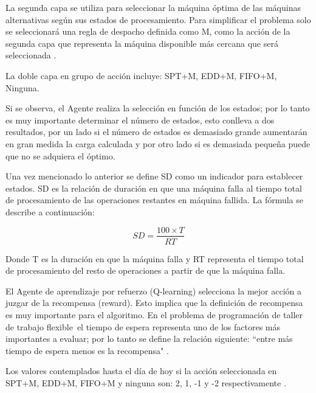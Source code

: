 \documentclass[letterpaper, 10 pt]{article}
\newcommand{\fjsp}{problema de programación de taller de trabajo flexible}
\begin{document}
La segunda capa se utiliza para seleccionar la máquina óptima de las máquinas alternativas según sus estados de procesamiento. Para simplificar el problema solo se seleccionará una regla de despacho definida como M, como la acción de la segunda capa que representa la máquina disponible más cercana que será seleccionada \citep{zhao2019improved}. 

La doble capa en grupo de acción incluye: SPT+M, EDD+M, FIFO+M, Ninguna.

Si se observa, el Agente realiza la selección en función de los estados; por lo tanto es muy importante determinar el número de estados, esto conlleva a dos resultados, por un lado si el número de estados es demasiado grande aumentarán en gran medida la carga calculada y por otro lado si es demasiada pequeña puede que no se adquiera el óptimo.

Una vez mencionado lo anterior se define SD como un indicador para establecer estados. SD es la relación de duración en que una máquina falla al tiempo total de procesamiento de las operaciones restantes en máquina fallida. La fórmula se describe a continuación:

\begin{equation}
	SD = \dfrac{100 \times T}{RT}
\end{equation}

Donde T es la duración en que la máquina falla y RT representa el tiempo total de procesamiento del resto de operaciones a partir de que la máquina falla. 

El Agente de aprendizaje por refuerzo (Q-learning) selecciona la mejor acción a juzgar de la recompensa (reward). Esto implica que la definición de recompensa es muy importante para el algoritmo. En el \fjsp \, el tiempo de espera representa uno de los factores más importantes a evaluar; por lo tanto se define la relación siguiente: ``entre más tiempo de espera menos es la recompensa" \citep{zhao2019improved}.

Los valores contemplados hasta el día de hoy si la acción seleccionada en SPT+M, EDD+M, FIFO+M y ninguna son: 2, 1, -1 y -2 respectivamente \citep{zhao2019improved}. 
\end{document}
